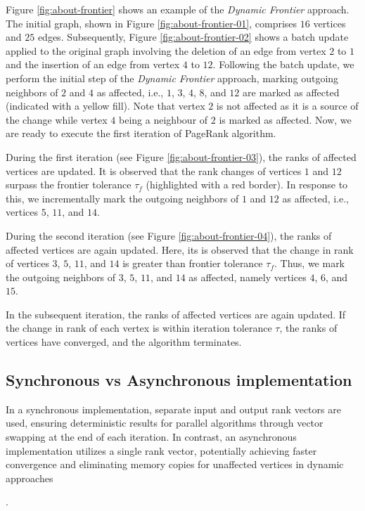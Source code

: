 Figure \ref{fig:about-frontier} shows an example of the \textit{Dynamic Frontier} approach. The initial graph, shown in Figure \ref{fig:about-frontier-01}, comprises $16$ vertices and $25$ edges. Subsequently, Figure \ref{fig:about-frontier-02} shows a batch update applied to the original graph involving the deletion of an edge from vertex $2$ to $1$ and the insertion of an edge from vertex $4$ to $12$. Following the batch update, we perform the initial step of the \textit{Dynamic Frontier} approach, marking outgoing neighbors of $2$ and $4$ as affected, i.e., $1$, $3$, $4$, $8$, and $12$ are marked as affected (indicated with a yellow fill). Note that vertex $2$ is not affected as it is a source of the change while vertex $4$ being a neighbour of $2$ is marked as affected. Now, we are ready to execute the first iteration of PageRank algorithm.

During the first iteration (see Figure \ref{fig:about-frontier-03}), the ranks of affected vertices are updated. It is observed that the rank changes of vertices $1$ and $12$ surpass the frontier tolerance $\tau_f$ (highlighted with a red border). In response to this, we incrementally mark the outgoing neighbors of $1$ and $12$ as affected, i.e., vertices $5$, $11$, and $14$. 

During the second iteration (see Figure \ref{fig:about-frontier-04}), the ranks of affected vertices are again updated. Here, its is observed that the change in rank of vertices $3$, $5$, $11$, and $14$ is greater than frontier tolerance $\tau_f$. Thus, we mark the outgoing neighbors of $3$, $5$, $11$, and $14$ as affected, namely vertices $4$, $6$, and $15$.

In the subsequent iteration, the ranks of affected vertices are again updated. If the change in rank of each vertex is within iteration tolerance $\tau$, the ranks of vertices have converged, and the algorithm terminates.




\subsection{Synchronous vs Asynchronous implementation}

In a synchronous implementation, separate input and output rank vectors are used, ensuring deterministic results for parallel algorithms through vector swapping at the end of each iteration. In contrast, an asynchronous implementation utilizes a single rank vector, potentially achieving faster convergence and eliminating memory copies for unaffected vertices in dynamic approaches.

